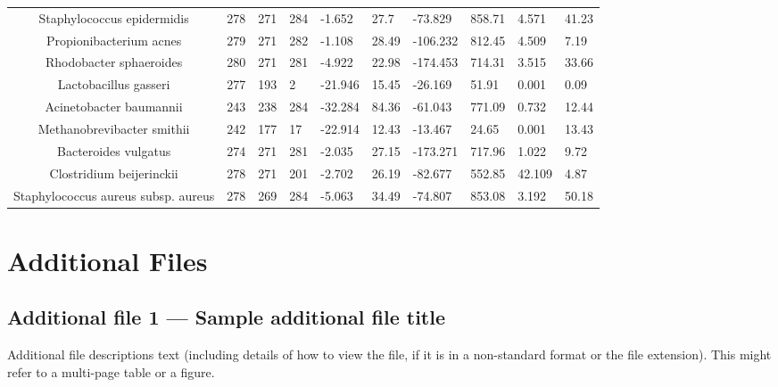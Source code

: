 \documentclass[10pt]{bmc_article}
\newenvironment{bmcformat}{\begin{raggedright}\baselineskip20pt\sloppy\setboolean{publ}{false}}{\end{raggedright}\baselineskip20pt\sloppy}
\begin{document}
\begin{bmcformat}
\begin{landscape}
{\begin{tabular}{|c|p{1cm}|p{1cm}|p{1cm}|p{1.5cm}|p{1.5cm}|p{1.5cm}|p{1.5cm}|p{1cm}|p{1.5cm}|}
        Staphylococcus epidermidis & 278 & 271 & 284 & -1.652 & 27.7 & -73.829 & 858.71 & 4.571 & 41.23 \\
        Propionibacterium acnes & 279 & 271 & 282 & -1.108 & 28.49 & -106.232 & 812.45 & 4.509 & 7.19 \\
        Rhodobacter sphaeroides & 280 & 271 & 281 & -4.922 & 22.98 & -174.453 & 714.31 & 3.515 & 33.66 \\
        Lactobacillus gasseri & 277 & 193 & 2 & -21.946 & 15.45 & -26.169 & 51.91 & 0.001 & 0.09 \\
        Acinetobacter baumannii & 243 & 238 & 284 & -32.284 & 84.36 & -61.043 & 771.09 & 0.732 & 12.44 \\
        Methanobrevibacter smithii & 242 & 177 & 17 & -22.914 & 12.43 & -13.467 & 24.65 & 0.001 & 13.43 \\
        Bacteroides vulgatus & 274 & 271 & 281 & -2.035 & 27.15 & -173.271 & 717.96 & 1.022 & 9.72 \\
        Clostridium beijerinckii & 278 & 271 & 201 & -2.702 & 26.19 & -82.677 & 552.85 & 42.109 & 4.87 \\
        Staphylococcus aureus subsp. aureus & 278 & 269 & 284 & -5.063 & 34.49 & -74.807 & 853.08 & 3.192 & 50.18 \\
        \hline
      \end{tabular}
    }
      \end{landscape}



\section*{Additional Files}
  \subsection*{Additional file 1 --- Sample additional file title}
    Additional file descriptions text (including details of how to
    view the file, if it is in a non-standard format or the file extension).  This might
    refer to a multi-page table or a figure.


\end{bmcformat}
\end{document}
